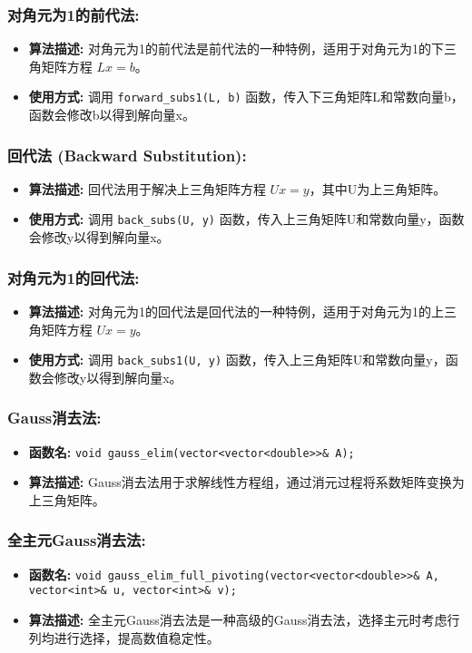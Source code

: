 \documentclass{article}
\begin{document}
\subsubsection*{对角元为1的前代法:}
\begin{itemize}
	\item \textbf{算法描述:} 对角元为1的前代法是前代法的一种特例，适用于对角元为1的下三角矩阵方程 \(Lx=b\)。
	\item \textbf{使用方式:} 调用 \texttt{forward\_subs1(L, b)} 函数，传入下三角矩阵L和常数向量b，函数会修改b以得到解向量x。
\end{itemize}

\subsubsection*{回代法 (Backward Substitution):}
\begin{itemize}
	\item \textbf{算法描述:} 回代法用于解决上三角矩阵方程 \(Ux=y\)，其中U为上三角矩阵。
	\item \textbf{使用方式:} 调用 \texttt{back\_subs(U, y)} 函数，传入上三角矩阵U和常数向量y，函数会修改y以得到解向量x。
\end{itemize}

\subsubsection*{对角元为1的回代法:}
\begin{itemize}
	\item \textbf{算法描述:} 对角元为1的回代法是回代法的一种特例，适用于对角元为1的上三角矩阵方程 \(Ux=y\)。
	\item \textbf{使用方式:} 调用 \texttt{back\_subs1(U, y)} 函数，传入上三角矩阵U和常数向量y，函数会修改y以得到解向量x。
\end{itemize}

\subsubsection*{Gauss消去法:}
\begin{itemize}
	\item \textbf{函数名:} \texttt{void gauss\_elim(vector<vector<double>>\& A);}
	\item \textbf{算法描述:} Gauss消去法用于求解线性方程组，通过消元过程将系数矩阵变换为上三角矩阵。
\end{itemize}

\subsubsection*{全主元Gauss消去法:}
\begin{itemize}
	\item \textbf{函数名:} \texttt{void gauss\_elim\_full\_pivoting(vector<vector<double>>\& A, vector<int>\& u, vector<int>\& v);}
	\item \textbf{算法描述:} 全主元Gauss消去法是一种高级的Gauss消去法，选择主元时考虑行列均进行选择，提高数值稳定性。
\end{itemize}
\end{document}
